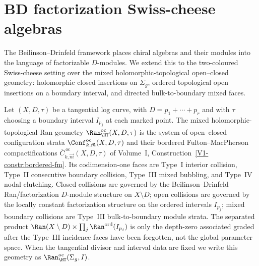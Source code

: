 \section{BD factorization Swiss-cheese algebras}
\label{sec:BD-factorization-SC}

The Beilinson--Drinfeld framework places chiral algebras and their
modules into the language of factorizable $D$-modules. We extend
this to the two-coloured Swiss-cheese setting over the mixed
holomorphic-topological open--closed geometry: holomorphic closed
insertions on $\Sigma_g$, ordered topological open insertions on a
boundary interval, and directed bulk-to-boundary mixed faces.

\begin{definition}
\label{def:mixed-ht-ran-geometry}
Let $(X,D,\tau)$ be a tangential log curve, with
$D=p_1+\cdots+p_r$ and with $\tau$ choosing a boundary interval
$I_{p_j}$ at each marked point. The mixed
holomorphic-topological Ran geometry
$\Ran^{\mathrm{oc}}_{\HT}(X,D,\tau)$ is the system of
open--closed configuration strata
$\Conf^{\mathrm{oc}}_{k,\vec m}(X,D,\tau)$ and their bordered
Fulton--MacPherson compactifications
$\overline C^{\,\mathrm{oc}}_{k,\vec m}(X,D,\tau)$ of
Volume~I, Construction~\ref*{V1-constr:bordered-fm}. Its
codimension-one faces are Type~I interior collision, Type~II
consecutive boundary collision, Type~III mixed bubbling, and
Type~IV nodal clutching. Closed collisions are governed by the
Beilinson--Drinfeld Ran/factorization $D$-module structure on
$X\setminus D$; open collisions are governed by the locally
constant factorization structure on the ordered intervals
$I_{p_j}$; mixed boundary collisions are Type~III bulk-to-boundary
module strata. The separated product
$\Ran(X\setminus D)\times\prod_j\Ran^{\mathrm{ord}}(I_{p_j})$
is only the depth-zero associated graded after the Type~III
incidence faces have been forgotten, not the global parameter
space. When the tangential divisor and interval data are fixed we
write this geometry as $\Ran^{\mathrm{oc}}_{\HT}(\Sigma_g,I)$.
\end{definition}

